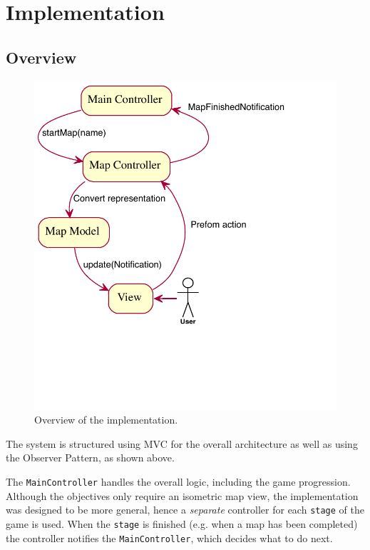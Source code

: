 
\section{Implementation}

\subsection{Overview}

\begin{figure}[htbp]
	\centering
		\includegraphics{figures/engine_exported.pdf}
	\caption{Overview of the implementation.}
	\label{fig:overview_engine}
\end{figure}

The system is structured using MVC for the overall architecture as well as  using the Observer Pattern, as shown above.

The \texttt{MainController} handles the overall logic, including the game progression. 
Although the objectives only require an isometric  map view, the implementation was designed to be more general,  hence a \emph{separate} controller for each \texttt{stage} of the game is used. When the \texttt{stage} is finished  (e.g. when a map has been completed) the controller notifies the \texttt{MainController}, which decides what to do next.   

